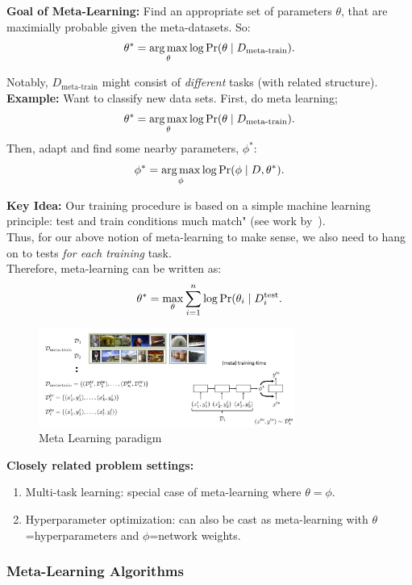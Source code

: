 {\bf Goal of Meta-Learning:} Find an appropriate set of parameters $\theta$, that are maximially probable given the meta-datasets. So:
\[
\theta^* = \operatorname*{arg\,max}_\theta \log \Pr(\theta \mid D_{\text{meta-train}}).
\]

Notably, $D_{\text{meta-train}}$ might consist of {\it different} tasks (with related structure). \\

{\bf Example:} Want to classify new data sets. First, do meta learning;
\[
\theta^* = \operatorname*{arg\,max}_\theta \log \Pr(\theta \mid D_{\text{meta-train}}).
\]
Then, adapt and find some nearby parameters, $\phi^*$:
\[
\phi^* = \operatorname*{arg\,max}_{\phi} \log \Pr(\phi \mid D, \theta^*).
\]


{\bf Key Idea:} Our training procedure is based on a simple machine learning principle: test and train conditions much match" (see work by~\citet{vinyals2016matching}). \\

Thus, for our above notion of meta-learning to make sense, we also need to hang on to tests {\it for each training} task. \\

Therefore, meta-learning can be written as:
\[
\theta^* = \max_\theta \sum_{i = 1}^n \log \Pr(\theta_i \mid D_i^{\text{test}}.
\]

\begin{figure}
    \centering
    \includegraphics[width=0.75\textwidth]{images/meta_learn_1.jpg}
    \caption{Meta Learning paradigm}
    \label{fig:meta_learn}
\end{figure}

{\bf Closely related problem settings:}
\begin{enumerate}
\item Multi-task learning: special case of meta-learning where $\theta = \phi$.
\item Hyperparameter optimization: can also be cast as meta-learning with $\theta$=hyperparameters and $\phi$=network weights.
\end{enumerate}

\subsubsection{Meta-Learning Algorithms}

